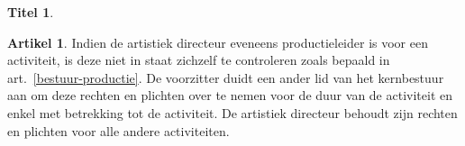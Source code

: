 \documentclass[a4paper,10pt]{article}
\theoremstyle{definition}
\newtheorem{titel}{\newline\Large Titel}
\newtheorem{artikelbase}{\large Artikel}
\newenvironment{artikel}
  {\begin{artikelbase}}
  {\smallskip
   \end{artikelbase}}
\newcommand{\ttextcr}{\hfill\newline}
\newcommand{\ttextenum}{\mbox{}}
\begin{document}
\begin{titel}

  \begin{artikel}\label{bestuur-vervanging}\ttextcr
    Indien de artistiek directeur eveneens productieleider is voor een activiteit, is deze niet in staat zichzelf te controleren zoals bepaald in art.~\ref{bestuur-productie}. %
    De voorzitter duidt een ander lid van het kernbestuur aan om deze rechten en plichten over te nemen voor de duur van de activiteit en enkel met betrekking tot de activiteit.
    De artistiek directeur behoudt zijn rechten en plichten voor alle andere activiteiten.
  \end{artikel}

\end{titel}

\end{document}
